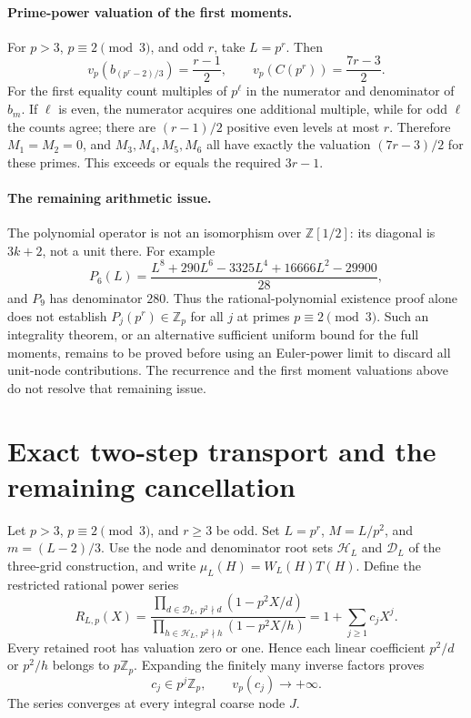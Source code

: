 \documentclass[11pt,letterpaper]{article}
\numberwithin{equation}{section}
\begin{document}
\paragraph{Prime-power valuation of the first moments.}
For $p>3$, $p\equiv2\pmod3$, and odd $r$, take $L=p^r$.
Then
\[
 v_p(b_{(p^r-2)/3})=\frac{r-1}{2},\qquad
 v_p(C(p^r))=\frac{7r-3}{2}.
\]
For the first equality count multiples of $p^\ell$ in the numerator
and denominator of $b_m$. If $\ell$ is even, the numerator acquires
one additional multiple, while for odd $\ell$ the counts agree;
there are $(r-1)/2$ positive even levels at most $r$.
Therefore $M_1=M_2=0$, and $M_3,M_4,M_5,M_6$ all have exactly the
valuation $(7r-3)/2$ for these primes. This exceeds or equals the
required $3r-1$.

\paragraph{The remaining arithmetic issue.}
The polynomial operator is not an isomorphism over
$\mathbb Z[1/2]$: its diagonal is $3k+2$, not a unit there.
For example
\[
 P_6(L)=\frac{L^8+290L^6-3325L^4+16666L^2-29900}{28},
\]
and $P_9$ has denominator $280$. Thus the rational-polynomial
existence proof alone does not establish $P_j(p^r)\in\mathbb Z_p$
for all $j$ at primes $p\equiv2\pmod3$. Such an integrality theorem,
or an alternative sufficient uniform bound for the full moments,
remains to be proved before using an Euler-power limit to discard
all unit-node contributions. The recurrence and the first moment
valuations above do not resolve that remaining issue.

\section{Exact two-step transport and the remaining cancellation}\label{loc-VI-5}
Let $p>3$, $p\equiv2\pmod3$, and $r\ge3$ be odd. Set
$L=p^r$, $M=L/p^2$, and $m=(L-2)/3$. Use the node and denominator
root sets $\mathcal H_L$ and $\mathcal D_L$ of the three-grid
construction, and write $\mu_L(H)=W_L(H)T(H)$.
Define the restricted rational power series
\[
 R_{L,p}(X)=
 \frac{\prod_{d\in\mathcal D_L,\,p^2\nmid d}(1-p^2X/d)}
 {\prod_{h\in\mathcal H_L,\,p^2\nmid h}(1-p^2X/h)}
 =1+\sum_{j\ge1}c_jX^j.
\]
Every retained root has valuation zero or one. Hence each linear
coefficient $p^2/d$ or $p^2/h$ belongs to $p\mathbb Z_p$.
Expanding the finitely many inverse factors proves
\[
 c_j\in p^j\mathbb Z_p,\qquad v_p(c_j)\longrightarrow+\infty.
\]
The series converges at every integral coarse node $J$.
\end{document}
